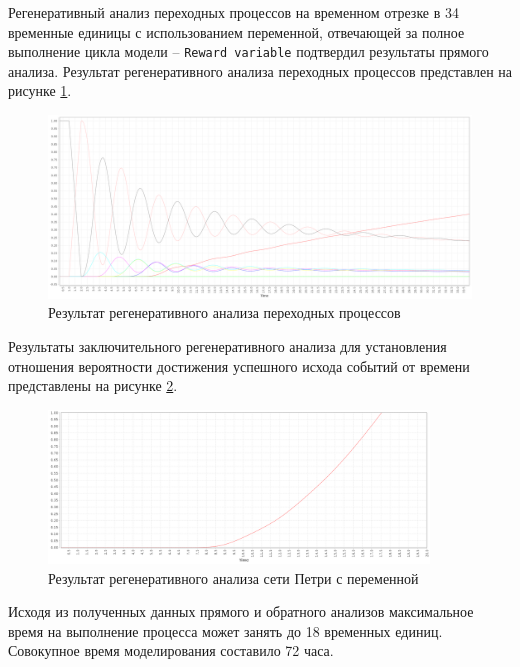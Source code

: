 \clearpage

Регенеративный анализ переходных процессов\cite{regenerative-transient} на временном отрезке в 34 временные единицы с использованием переменной, отвечающей за полное выполнение цикла модели -- \texttt{Reward variable}\cite{reward} подтвердил результаты прямого анализа. Результат регенеративного анализа переходных процессов представлен на рисунке \ref{fig:rt}.

\clearpage

\begin{figure}
	\centering
	\includegraphics[width=\textwidth]{inc/timed_reward.png}
	\caption{Результат регенеративного анализа переходных процессов}
	\label{fig:rt}
\end{figure}

\clearpage

Результаты заключительного регенеративного анализа для установления отношения вероятности достижения успешного исхода событий от времени представлены на рисунке \ref{fig:sp}.

\begin{figure}[h!btp]
	\centering
	\includegraphics[width=0.9\textwidth]{inc/stud_prob.png}
	\caption{Результат регенеративного анализа сети Петри с переменной}
	\label{fig:sp}
\end{figure}

Исходя из полученных данных прямого и обратного анализов максимальное время на выполнение процесса может занять до 18 временных единиц. Совокупное время моделирования составило 72 часа.

